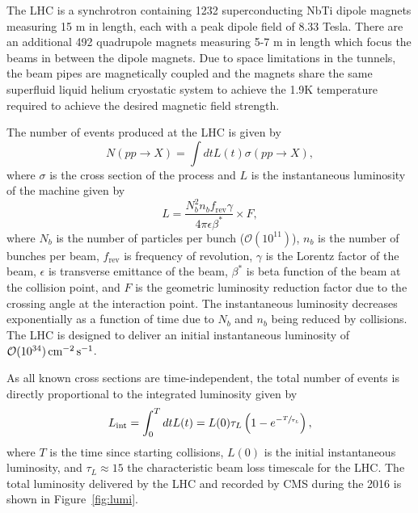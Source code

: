 The LHC is a synchrotron containing 1232 superconducting NbTi dipole magnets measuring 15 m in length, each with a peak dipole field of 8.33 Tesla. 
There are an additional 492 quadrupole magnets measuring 5-7 m in length which focus the beams in between the dipole magnets.
Due to space limitations in the tunnels, the beam pipes are magnetically coupled and the magnets share the same superfluid liquid helium cryostatic system to achieve the 1.9K temperature required to achieve the desired magnetic field strength.

The number of events produced at the LHC is given by
\begin{equation}
  N(pp \rightarrow X) = \int dt L(t) \sigma(pp \rightarrow X),
\end{equation}
where $\sigma$ is the cross section of the process and $L$ is the instantaneous luminosity of the machine given by
\begin{equation}
  L = \frac{N_b^2 n_b f_{\text{rev}} \gamma}{4 \pi \epsilon \beta^*} \times F,
\end{equation}
where $N_b$ is the number of particles per bunch ($\mathcal{O}(10^11)$),
$n_b$ is the number of bunches per beam,
$f_{\text{rev}}$ is frequency of revolution,
$\gamma$ is the Lorentz factor of the beam,
$\epsilon$ is transverse emittance of the beam,
$\beta^*$ is beta function of the beam at the collision point,
and $F$ is the geometric luminosity reduction factor due to the crossing angle at the interaction point.
The instantaneous luminosity decreases exponentially as a function of time due to $N_b$ and $n_b$ being reduced by collisions.
The LHC is designed to deliver an initial instantaneous luminosity of $\mathcal{O}(10^{34}) \,\text{cm}^{-2}\,\text{s}^{-1}$.

As all known cross sections are time-independent, the total number of events is directly proportional to the integrated luminosity given by
\begin{equation}
  L_{\text{int}} = \int_0^T dt L(t) = L(0) \tau_L \left(1 - e^{-\sfrac{T}{\tau_L}} \right),
\end{equation}
where $T$ is the time since starting collisions,
$L(0)$ is the initial instantaneous luminosity,
and $\tau_L \approx 15$ the characteristic beam loss timescale for the LHC.
The total luminosity delivered by the LHC and recorded by CMS during the 2016 is shown in Figure~\ref{fig:lumi}.

